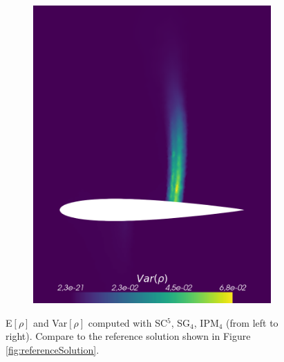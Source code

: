 \begin{figure}[h!]
\begin{subfigure}{0.329\linewidth}
		\includegraphics[width=\linewidth]{figs/Euler1DPlots5/osIPM4-4_VarRho.png}
		\label{fig:sub1}
	\end{subfigure}
	\caption{E$[\rho]$ and Var$[\rho]$ computed with SC$^5$, SG$_4$, IPM$_4$ (from left to right). Compare to the reference solution shown in Figure \ref{fig:referenceSolution}.}
	\label{fig:ERhoVarRho5}
\end{figure}

